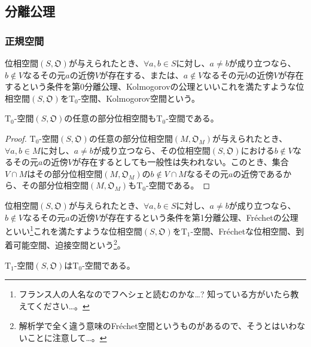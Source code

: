 \documentclass[dvipdfmx]{jsarticle}
\begin{document}
\subsection{分離公理}%
\subsubsection{正規空間}%
\begin{dfn}
位相空間$\left( S,\mathfrak{O} \right)$が与えられたとき、$\forall a,b \in S$に対し、$a \neq b$が成り立つなら、$b \notin V$なるその元$a$の近傍$V$が存在する、または、$a \notin V$なるその元$b$の近傍$V$が存在するという条件を第0分離公理、Kolmogorovの公理といいこれを満たすような位相空間$\left( S,\mathfrak{O} \right)$を$\mathrm{T}_{0}$-空間、Kolmogorov空間という。
\end{dfn}
\begin{thm}\label{8.1.7.1}
$\mathrm{T}_{0}$-空間$\left( S,\mathfrak{O} \right)$の任意の部分位相空間も$\mathrm{T}_{0}$-空間である。
\end{thm}
\begin{proof}
$\mathrm{T}_{0}$-空間$\left( S,\mathfrak{O} \right)$の任意の部分位相空間$\left( M,\mathfrak{O}_{M} \right)$が与えられたとき、$\forall a,b \in M$に対し、$a \neq b$が成り立つなら、その位相空間$\left( S,\mathfrak{O} \right)$における$b \notin V$なるその元$a$の近傍$V$が存在するとしても一般性は失われない。このとき、集合$V \cap M$はその部分位相空間$\left( M,\mathfrak{O}_{M} \right)$の$b \notin V \cap M$なるその元$a$の近傍であるから、その部分位相空間$\left( M,\mathfrak{O}_{M} \right)$も$\mathrm{T}_{0}$-空間である。
\end{proof}
\begin{dfn}
位相空間$\left( S,\mathfrak{O} \right)$が与えられたとき、$\forall a,b \in S$に対し、$a \neq b$が成り立つなら、$b \notin V$なるその元$a$の近傍$V$が存在するという条件を第1分離公理、Fréchetの公理といい\footnote{フランス人の人名なのでフヘシェと読むのかな…? 知っている方がいたら教えてください…。}これを満たすような位相空間$\left( S,\mathfrak{O} \right)$を$\mathrm{T}_{1}$-空間、Fréchetな位相空間、到着可能空間、迫接空間という\footnote{解析学で全く違う意味のFréchet空間というものがあるので、そうとはいわないことに注意して…。}。
\end{dfn}
\begin{thm}\label{8.1.7.2}
$\mathrm{T}_{1}$-空間$\left( S,\mathfrak{O} \right)$は$\mathrm{T}_{0}$-空間である。
\end{thm}
\end{document}
